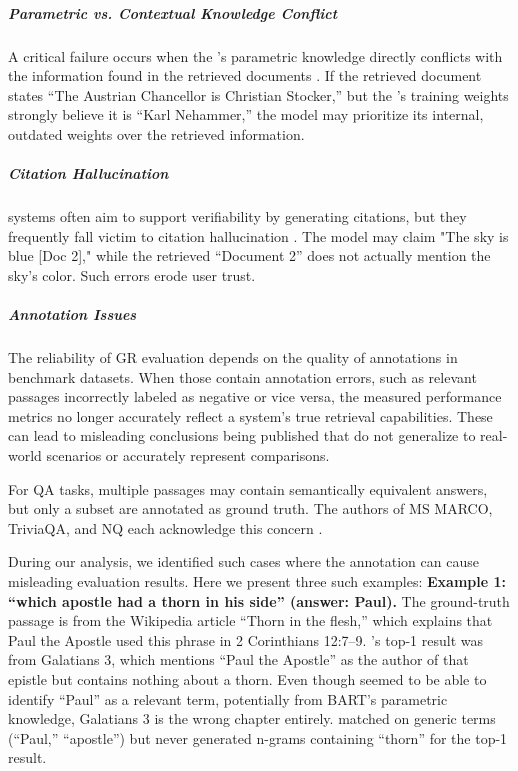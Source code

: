 \subparagraph{Parametric vs. Contextual Knowledge Conflict}
A critical failure occurs when the 's parametric knowledge directly conflicts with the information found in the retrieved documents \cite{mindfulragfailure}. If the retrieved document states ``The Austrian Chancellor is Christian Stocker,'' but the 's training weights strongly believe it is ``Karl Nehammer,'' the model may prioritize its internal, outdated weights over the retrieved information.

\subparagraph{Citation Hallucination}
 systems often aim to support verifiability by generating citations, but they frequently fall victim to citation hallucination \cite{niu-etal-2024-ragtruth}. The model may claim "The sky is blue [Doc 2]," while the retrieved ``Document 2'' does not actually mention the sky's color. Such errors erode user trust.


\subparagraph{Annotation Issues}
\label{sec:annotation}

The reliability of GR evaluation depends on the quality of  annotations in benchmark datasets. When those contain annotation errors, such as relevant passages incorrectly labeled as negative or vice versa, the measured performance metrics no longer accurately reflect a system's true retrieval capabilities. These can lead to misleading conclusions being published that do not generalize to real-world scenarios or accurately represent comparisons.

For QA tasks, multiple passages may contain semantically equivalent answers, but only a subset are annotated as ground truth. The authors of MS MARCO, TriviaQA, and NQ each acknowledge this concern \cite{payal-bajaj-ms-marco,joshi-triviaqa-a,kwiatkowski-natural-questions}.

During our analysis, we identified such cases where the annotation can cause misleading evaluation results. Here we present three such examples:
\textbf{Example 1: ``which apostle had a thorn in his side'' (answer: Paul).} The ground-truth passage 
is from the Wikipedia article ``Thorn in the flesh,'' which explains that Paul the Apostle used this phrase in 2 Corinthians 12:7--9. 's  top-1 result 
was from Galatians 3, which mentions ``Paul the Apostle'' as the author of that epistle but contains nothing about a thorn. Even though  seemed to be able to identify ``Paul'' as a relevant term, potentially from BART's parametric knowledge, Galatians 3 is the wrong chapter entirely.  matched on generic terms (``Paul,'' ``apostle'') but never generated n-grams containing ``thorn'' for the top-1 result.

